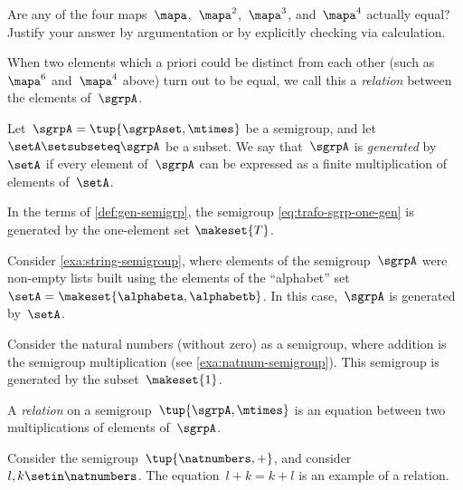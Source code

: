\begin{gradedexercise}
    \label{ex:CheckRelations}
    Are any of the four maps~$\mapa$,~$\mapa^2$,~$\mapa^3$, and~$\mapa^4$ actually equal?
    Justify your answer by argumentation or by explicitly checking via calculation.
\end{gradedexercise}

When two elements which a priori could be distinct from each other (such as~$\mapa^6$ and~$\mapa^4$ above) turn out to be equal, we call this a \emph{relation} between the elements of~$\sgrpA$.

\begin{ctdefinition}
    \label{def:gen-semigrp}
    Let~$\sgrpA = \tup{\sgrpAset, \mtimes}$ be a semigroup, and let~$\setA \setsubseteq \sgrpA$ be a subset.
    We say that~$\sgrpA$ is \emph{generated} by~$\setA$ if every element of~$\sgrpA$ can be expressed as a finite multiplication of elements of~$\setA$.
\end{ctdefinition}

\begin{remark}
    In the terms of \cref{def:gen-semigrp}, the semigroup \cref{eq:trafo-sgrp-one-gen} is generated by the one-element set $\makeset{ T }$.
\end{remark}

\begin{example}
    Consider \cref{exa:string-semigroup}, where elements of the semigroup~$\sgrpA$ were non-empty lists built using the elements of the ``alphabet'' set~$\setA = \makeset{ \alphabeta, \alphabetb}$.
    In this case,~$\sgrpA$ is generated by~$\setA$.
\end{example}

\begin{example}
    Consider the natural numbers (without zero) as a semigroup, where addition is the semigroup multiplication (see \cref{exa:natnum-semigroup}).
    This semigroup is generated by the subset~$\makeset{1 }$.
\end{example}

\begin{ctdefinition}
    A \emph{relation} on a semigroup~$\tup{\sgrpA, \mtimes}$ is an equation between two multiplications of elements of~$\sgrpA$.
\end{ctdefinition}

\begin{example}
    Consider the semigroup~$\tup{\natnumbers, +}$, and consider~$l, k \setin \natnumbers$.
    The equation~$l + k = k + l$ is an example of a relation.
\end{example}

